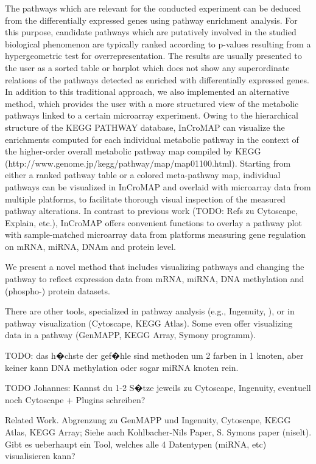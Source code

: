 \documentclass{bioinfo}
\begin{document}
The pathways which are relevant for the conducted experiment can be deduced from the differentially expressed genes using pathway enrichment analysis. For this purpose, candidate pathways which are putatively involved in the studied biological phenomenon are typically ranked according to p-values resulting from a hypergeometric test for overrepresentation. The results are usually presented to the user as a sorted table or barplot which does not show any superordinate relations of the pathways detected as enriched with differentially expressed genes. In addition to this traditional approach, we also implemented an alternative method, which provides the user with a more structured view of the metabolic pathways linked to a certain microarray experiment. Owing to the hierarchical structure of the KEGG PATHWAY database, InCroMAP can visualize the enrichments computed for each individual metabolic pathway in the context of the higher-order overall metabolic pathway map compiled by KEGG (http://www.genome.jp/kegg/pathway/map/map01100.html). Starting from either a ranked pathway table or a colored meta-pathway map, individual pathways can be visualized in InCroMAP and overlaid with microarray data from multiple platforms, to facilitate thorough visual inspection of the measured pathway alterations. In contrast to previous work (TODO: Refs zu Cytoscape, Explain, etc.), InCroMAP offers convenient functions to overlay a pathway plot with sample-matched microarray data from platforms measuring gene regulation on mRNA, miRNA, DNAm and protein level.



We present a novel method that includes visualizing pathways and changing the pathway to reflect expression data from mRNA, miRNA, DNA methylation and (phospho-) protein datasets.



There are other tools, specialized in pathway analysis (e.g., Ingenuity, ), or in pathway visualization (Cytoscape, KEGG Atlas). Some even offer visualizing data in a pathway (GenMAPP, KEGG Array, Symony programm). 

TODO: das h�chste der gef�hle sind methoden um 2 farben in 1 knoten, aber keiner kann DNA methylation oder sogar miRNA knoten rein.

TODO Johannes: Kannst du 1-2 S�tze jeweils zu Cytoscape, Ingenuity, eventuell noch Cytoscape + Plugins schreiben?


Related Work. Abgrenzung zu GenMAPP und Ingenuity, Cytoscape, KEGG Atlas, KEGG Array; Siehe auch Kohlbacher-Nils Paper, S. Symons paper (niselt).
Gibt es ueberhaupt ein Tool, welches alle 4 Datentypen (miRNA, etc) visualisieren kann?
\end{document}
